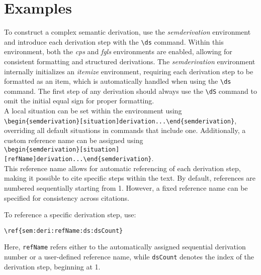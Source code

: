 \documentclass[10pt, a4paper]{article}
\begin{document}
	\section{Examples}
	To construct a complex semantic derivation, use the \textit{semderivation} environment and introduce each derivation step with the \verb=\ds= command. Within this environment, both the \textit{cps} and \textit{fgls} environments are enabled, allowing for consistent formatting and structured derivations. The \textit{semderivation} environment internally initializes an \textit{itemize} environment, requiring each derivation step to be formatted as an item, which is automatically handled when using the \verb=\ds= command. The first step of any derivation should always use the \verb=\dS= command to omit the initial equal sign for proper formatting.\\
	A local situation can be set within the environment using \\\verb=\begin{semderivation}[situation]derivation...\end{semderivation}=, overriding all default situations in commands that include one. Additionally, a custom reference name can be assigned using \\\verb=\begin{semderivation}[situation][refName]derivation...\end{semderivation}=. \\This reference name allows for automatic referencing of each derivation step, making it possible to cite specific steps within the text. By default, references are numbered sequentially starting from 1. However, a fixed reference name can be specified for consistency across citations.
	
	To reference a specific derivation step, use:
	
	\verb=\ref{sem:deri:refName:ds:dsCount}=
	
	Here, \texttt{refName} refers either to the automatically assigned sequential derivation number or a user-defined reference name, while \texttt{dsCount} denotes the index of the derivation step, beginning at 1.
	
\end{document}
